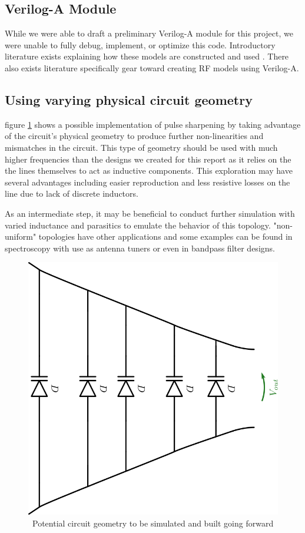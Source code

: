 \documentclass[journal]{IEEEtran}
\begin{document}
\subsection{Verilog-A Module}
    While we were able to draft a preliminary Verilog-A module for this project, we were unable to fully debug, implement, or optimize this code. Introductory literature exists explaining how these models are constructed and used \cite{VerilogAFun}. There also exists literature specifically gear toward creating RF models using Verilog-A\cite{VerilogARF}.
    
    




\subsection{Using varying physical circuit geometry}

figure \ref{fig:WeirdGeo} shows a possible implementation of pulse sharpening by taking advantage of the circuit's physical geometry to produce further non-linearities and mismatches in the circuit. This type of geometry should be used with much higher frequencies than the designs we created for this report as it relies on the the lines themselves to act as inductive components. This  exploration may have several advantages including easier reproduction and less resistive losses on the line due to lack of discrete inductors. 

As an intermediate step, it may be beneficial to conduct further simulation with varied inductance and parasitics to emulate the behavior of this topology. "non-uniform" topologies have other applications and some examples can be found in spectroscopy\cite{palmer2014performance} with use as antenna tuners\cite{cure2012non} or even in bandpass filter designs\cite{NonUniformBandpass}.


\begin{figure}[htb]
\centering
\includegraphics[width=0.45\linewidth]{WeirdNTLTGeometry.png}
\caption{\ Potential circuit geometry to be simulated and built going forward
}\label{fig:WeirdGeo}
\end{figure}
\end{document}
